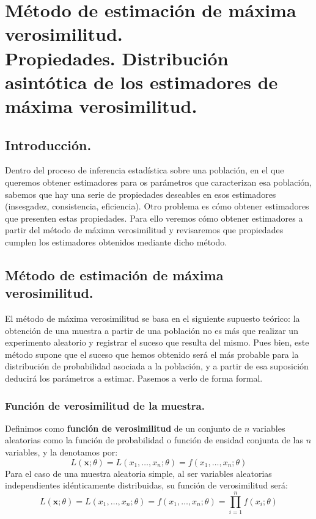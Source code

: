 \chapter[M\'etodo de estimaci\'on de m\'axima verosimilitud.]{M\'etodo de estimaci\'on de m\'axima verosimilitud. \\
\normalsize Propiedades. Distribuci\'on asint\'otica de los estimadores de m\'axima verosimilitud.}
\section{Introducci\'on.}

Dentro del proceso de inferencia estad\'istica sobre una poblaci\'on, en el que queremos obtener estimadores para os par\'ametros que caracterizan esa poblaci\'on, sabemos que hay una serie de propiedades deseables en esos estimadores (insesgadez, consistencia, eficiencia). Otro problema es c\'omo obtener estimadores que presenten estas propiedades. Para ello veremos c\'omo obtener estimadores a partir del m\'etodo de m\'axima verosimilitud y revisaremos que propiedades cumplen los estimadores obtenidos mediante dicho m\'etodo.

\section{M\'etodo de estimaci\'on de m\'axima verosimilitud.}

El m\'etodo de m\'axima verosimilitud se basa en el siguiente supuesto te\'orico: la obtenci\'on de una muestra a partir de una poblaci\'on no es m\'as que realizar un experimento aleatorio y registrar el suceso que resulta del mismo. Pues bien, este m\'etodo supone que el suceso que hemos obtenido ser\'a el m\'as probable para la distribuci\'on de probabilidad asociada a la poblaci\'on, y a partir de esa suposici\'on deducir\'a los par\'ametros a estimar. Pasemos a verlo de forma formal.

\subsection{Funci\'on de verosimilitud de la muestra.}

\begin{definicion}
Definimos como \textbf{funci\'on de verosimilitud} de un conjunto de $n$ variables aleatorias como la funci\'on de probabilidad o funci\'on de ensidad conjunta de las $n$ variables, y la denotamos por:
\begin{equation*}
L(\boldsymbol{x};\theta)=L(x_1,\ldots,x_n;\theta)=f(x_1,\ldots,x_n;\theta)
\end{equation*}
Para el caso de una muestra aleatoria simple, al ser variables aleatorias independientes id\'enticamente distribuidas, su funci\'on de verosimilitud ser\'a:
\begin{equation*}
L(\boldsymbol{x};\theta)=L(x_1,\ldots,x_n;\theta)=f(x_1,\ldots,x_n;\theta)=\prod_{i=1}^nf(x_i;\theta)
\end{equation*}
\end{definicion}

